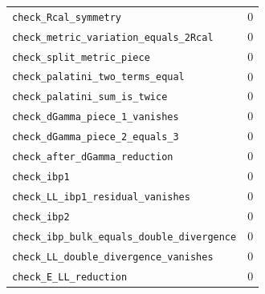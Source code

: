 \documentclass[11pt,a4paper]{article}
\begin{document}
\begin{longtable}{p{}c}
\texttt{check\_Rcal\_symmetry} & $0$\\
\texttt{check\_metric\_variation\_equals\_2Rcal} & $0$\\
\texttt{check\_split\_metric\_piece} & $0$\\
\texttt{check\_palatini\_two\_terms\_equal} & $0$\\
\texttt{check\_palatini\_sum\_is\_twice} & $0$\\
\texttt{check\_dGamma\_piece\_1\_vanishes} & $0$\\
\texttt{check\_dGamma\_piece\_2\_equals\_3} & $0$\\
\texttt{check\_after\_dGamma\_reduction} & $0$\\
\texttt{check\_ibp1} & $0$\\
\texttt{check\_LL\_ibp1\_residual\_vanishes} & $0$\\
\texttt{check\_ibp2} & $0$\\
\texttt{check\_ibp\_bulk\_equals\_double\_divergence} & $0$\\
\texttt{check\_LL\_double\_divergence\_vanishes} & $0$\\
\texttt{check\_E\_LL\_reduction} & $0$\\
\bottomrule
\end{longtable}
\end{document}
